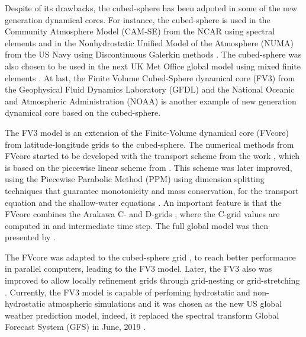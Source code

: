 Despite of its drawbacks, the cubed-sphere has been adpoted in some of the new generation
dynamical cores.
For instance, the cubed-sphere is used in the 
Community Atmosphere Model (CAM-SE) from the NCAR using spectral elements \citep{dennis:2012} and in the
Nonhydrostatic Unified Model of the Atmosphere (NUMA) from the US Navy using Discontinuous Galerkin 
methods \citep{giraldo:2013}. The cubed-sphere was also chosen to be used in the next UK Met Office
global model using mixed finite elements \citep{melvin:2022}.
At last, the Finite­ Volume Cubed-Sphere dynamical core (FV3) from the Geophysical Fluid 
Dynamics Laboratory (GFDL) and the National Oceanic and Atmospheric Administration (NOAA)
\citep{putman:2007,harris:2013} is another example
of new generation dynamical core based on the cubed-sphere.

The FV3 model is an extension of the Finite-Volume dynamical core (FVcore)
from latitude-longitude grids to the cubed-sphere.
The numerical methods from FVcore started to be developed with the transport scheme from the work \citet{lin:1994},
which is based on the piecewise linear scheme from \citet{vanleer:1977}. 
This scheme was later improved, using the Piecewise Parabolic Method (PPM) \citep{colella:1984, carpenter:1990}
using dimension splitting techniques that guarantee monotonicity and mass conservation,
for the transport equation \citep{lin:1996} and the shallow-water equations \citep{lin:1997}. 
An important feature is that the FVcore combines the  Arakawa C- and D-grids \citep{arakawa:1977},
where the C-grid values are computed in and intermediate time step. 
The full global model was then presented by \citet{lin:2004}.

The FVcore was adapted to the cubed-sphere grid \citep{putmanthesis:2007, putman:2007}, 
to reach better performance in parallel computers, leading to the FV3 model.
Later, the FV3 also was improved to allow locally refinement grids 
through grid-nesting or grid-stretching \citep{harris:2013}.
Currently, the FV3 model is capable of perfoming hydrostatic and non-hydrostatic atmospheric simulations 
and it was chosen as the new US global weather prediction model, indeed, it replaced the spectral transform
Global Forecast System (GFS) in June, 2019 \citep{samenow:2019}.

